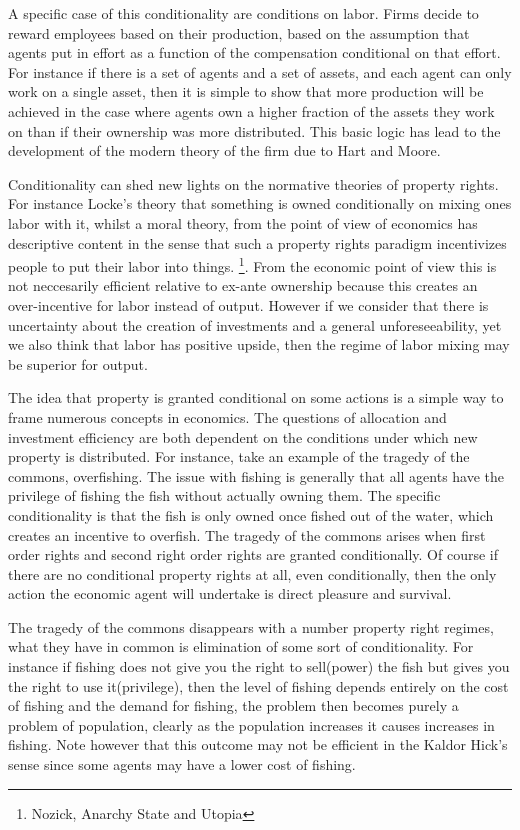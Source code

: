 \documentclass[12pt]{article}
\numberwithin{equation}{section}
\begin{document}
A specific case of this conditionality are conditions on labor. Firms decide to reward employees based on their production, based on the assumption that agents put in effort as a function of the compensation conditional on that effort. For instance if there is a set of agents and a set of assets, and each agent can only work on a single asset, then it is simple to show that more production will be achieved in the case where agents own a higher fraction of the assets they work on than if their ownership was more distributed. This basic logic has lead to the development of the modern theory of the firm due to Hart and Moore. 


Conditionality can shed new lights on the normative theories of property rights. For instance Locke's theory that something is owned conditionally on mixing ones labor with it, whilst a moral theory, from the point of view of economics has descriptive content in the sense that such a property rights paradigm incentivizes people to put their labor into things. \footnote{Nozick, Anarchy State and Utopia}. From the economic point of view this is not neccesarily efficient relative to ex-ante ownership because this creates an over-incentive for labor instead of output. However if we consider that there is uncertainty about the creation of investments and a general unforeseeability, yet we also think that labor has positive upside, then the regime of labor mixing may be superior for output. 

The idea that property is granted conditional on some actions is a simple way to frame numerous concepts in economics. The questions of allocation and investment efficiency are both dependent on the conditions under which new property is distributed. For instance, take an example of the tragedy of the commons, overfishing. The issue with fishing is generally that all agents have the privilege of fishing the fish without actually owning them. The specific conditionality is that the fish is only owned once fished out of the water, which creates an incentive to overfish. The tragedy of the commons arises when first order rights and second right order rights are granted conditionally. Of course if there are no conditional property rights at all, even conditionally, then the only action the economic agent will undertake is direct pleasure and survival. 

The tragedy of the commons disappears with a number property right regimes, what they have in common is elimination of some sort of conditionality. For instance if fishing does not give you the right to sell(power) the fish but gives you the right to use it(privilege), then the level of fishing depends entirely on the cost of fishing and the demand for fishing, the problem then becomes purely a problem of population, clearly as the population increases it causes increases in fishing. Note however that this outcome may not be efficient in the Kaldor Hick's sense since some agents may have a lower cost of fishing. 
\end{document}
